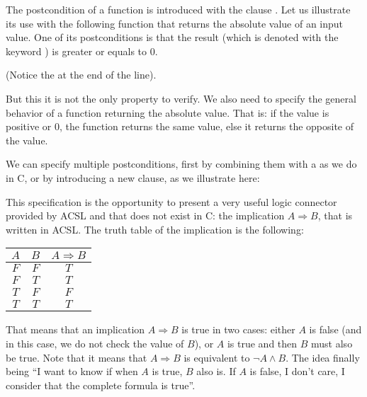 The postcondition of a function is introduced with the clause . 
Let us illustrate its use with the following function
that returns the absolute value of an input value. One of its postconditions
is that the result (which is denoted with the keyword
) is greater or equals to 0.






(Notice the \CodeInline{;} at the end of the line).

But this it is not the only property to verify. We also need to specify
the general behavior of a function returning the absolute value. That
is: if the value is positive or 0, the function returns the same value,
else it returns the opposite of the value.

We can specify multiple postconditions, first by combining them with a
\CodeInline{\&\&} as we do in C, or by introducing a new 
clause, as we illustrate here:







This specification is the opportunity to present a very useful logic
connector provided by ACSL and that does not exist in C: the implication
$A \Rightarrow B$, that is written  in
ACSL. The truth table of the implication is the following:



\begin{longtabu}{|c|c|c|} \hline
$A$ & $B$ & $A \Rightarrow B$ \\ \hline
$F$ & $F$ & $T$ \\ \hline
$F$ & $T$ & $T$ \\ \hline
$T$ & $F$ & $F$ \\ \hline
$T$ & $T$ & $T$ \\ \hline
\end{longtabu}



That means that an implication $A \Rightarrow B$ is true in two cases:
either $A$ is false (and in this case, we do not check the value of
$B$), or $A$ is true and then $B$ must also be true. Note that it means
that $A \Rightarrow B$ is equivalent to $\neg A \wedge B$. The idea
finally being ``I want to know if when $A$ is true, $B$ also is. If
$A$ is false, I don't care, I consider that the complete formula is
true''.



